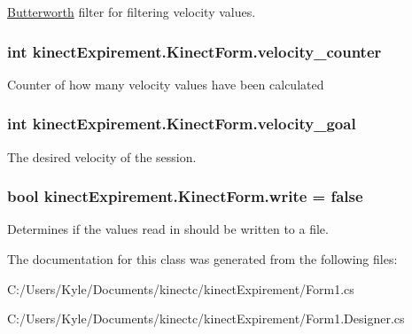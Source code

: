 \hyperlink{classkinect_expirement_1_1_butterworth}{Butterworth} filter for filtering velocity values. 

\subsubsection[{\texorpdfstring{velocity\+\_\+counter}{velocity_counter}}]{\setlength{\rightskip}{0pt plus 5cm}int kinect\+Expirement.\+Kinect\+Form.\+velocity\+\_\+counter}\hypertarget{classkinect_expirement_1_1_kinect_form_aedd93118198e798ee966ff768038bac1}{}\label{classkinect_expirement_1_1_kinect_form_aedd93118198e798ee966ff768038bac1}


Counter of how many velocity values have been calculated 

\subsubsection[{\texorpdfstring{velocity\+\_\+goal}{velocity_goal}}]{\setlength{\rightskip}{0pt plus 5cm}int kinect\+Expirement.\+Kinect\+Form.\+velocity\+\_\+goal}\hypertarget{classkinect_expirement_1_1_kinect_form_a6334825924ef2914544c0c96c0ad0572}{}\label{classkinect_expirement_1_1_kinect_form_a6334825924ef2914544c0c96c0ad0572}


The desired velocity of the session. 

\subsubsection[{\texorpdfstring{write}{write}}]{\setlength{\rightskip}{0pt plus 5cm}bool kinect\+Expirement.\+Kinect\+Form.\+write = false}\hypertarget{classkinect_expirement_1_1_kinect_form_a2faba08ba3886e70886d6289dcc09896}{}\label{classkinect_expirement_1_1_kinect_form_a2faba08ba3886e70886d6289dcc09896}


Determines if the values read in should be written to a file. 



The documentation for this class was generated from the following files\+:\begin{DoxyCompactItemize}
\item 
C\+:/\+Users/\+Kyle/\+Documents/kinectc/kinect\+Expirement/Form1.\+cs\item 
C\+:/\+Users/\+Kyle/\+Documents/kinectc/kinect\+Expirement/Form1.\+Designer.\+cs\end{DoxyCompactItemize}
